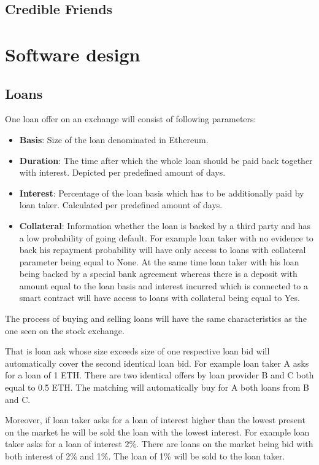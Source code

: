 \documentclass[a4paper,12pt,twoside,openany]{report}
\begin{document}
\section{Credible Friends}

\chapter{Software design}

\section{Loans}
One loan offer on an exchange will consist of following parameters:
\begin{itemize}
\item \textbf{Basis}: Size of the loan denominated in Ethereum.
\item \textbf{Duration}: The time after which the whole loan should be paid back together with interest. Depicted per predefined amount of days.
\item \textbf{Interest}: Percentage of the loan basis which has to be additionally paid by loan taker. Calculated per predefined amount of days.
\item \textbf{Collateral}: Information whether the loan is backed by a third party and has a low probability of going default. For example loan taker with no evidence to back his repayment probability will have only access to loans with collateral parameter being equal to None. At the same time loan taker with his loan being backed by a special bank agreement whereas there is a deposit with amount equal to the loan basis and interest incurred which is connected to a smart contract will have access to loans with collateral being equal to Yes.
\end{itemize}

The process of buying and selling loans will have the same characteristics as the one seen on the stock exchange. 

That is loan ask whose size exceeds size of one respective loan bid will automatically cover the second identical loan bid. For example loan taker A asks for a loan of 1 ETH. There are two identical offers by loan provider B and C both equal to 0.5 ETH. The matching will automatically buy for A both loans from B and C.

Moreover, if loan taker asks for a loan of interest higher than the lowest present on the market he will be sold the loan with the lowest interest. For example loan taker asks for a loan of interest 2\%. There are loans on the market being bid with both interest of 2\% and 1\%. The loan of 1\% will be sold to the loan taker.
\end{document}
